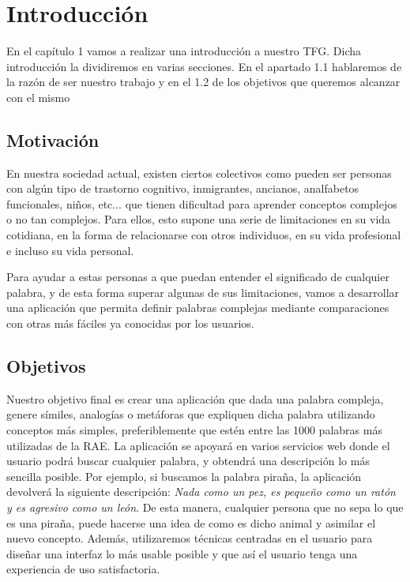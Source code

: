 \chapter{Introducción}
\label{cap:introduccion}


\begin{resumen}
	En el capítulo 1 vamos a realizar una introducción a nuestro TFG. Dicha introducción la dividiremos en varias secciones. En el apartado 1.1 hablaremos de la razón de ser nuestro trabajo y en el 1.2 de los objetivos que queremos alcanzar con el mismo
	
	
\end{resumen}


\section{Motivación}
\label{cap:sec:motivacion}
En nuestra sociedad actual, existen ciertos colectivos como pueden ser personas con algún tipo de trastorno cognitivo, inmigrantes, ancianos, analfabetos funcionales, niños, etc... que tienen dificultad para aprender conceptos complejos o no tan complejos. Para ellos, esto supone una serie de limitaciones en su vida cotidiana, en la forma de relacionarse con otros individuos, en su vida profesional e incluso su vida personal.

Para ayudar a estas personas a que puedan entender el significado de cualquier palabra, y de esta forma superar algunas de sus limitaciones, vamos a desarrollar una aplicación que permita definir palabras complejas mediante comparaciones con otras más fáciles ya conocidas por los usuarios. 

\section{Objetivos}
\label{cap:sec:objetivos}
Nuestro objetivo final es crear una aplicación que dada una palabra compleja, genere símiles, analogías o metáforas que expliquen dicha palabra utilizando conceptos más simples, preferiblemente que estén entre las 1000 palabras más utilizadas de la RAE.
La aplicación se apoyará en varios servicios web donde el usuario podrá buscar cualquier palabra, y obtendrá una descripción lo más sencilla posible. Por ejemplo, si buscamos la palabra piraña, la aplicación devolverá la siguiente descripción:  \textit{Nada como un pez, es pequeño como un ratón y es agresivo como un león}. De esta manera, cualquier persona que no sepa lo que es una piraña, puede hacerse una idea de como es dicho animal y asimilar el nuevo concepto. Además, utilizaremos técnicas centradas en el usuario para diseñar una interfaz lo más usable posible y que así el usuario tenga una experiencia de uso satisfactoria.

